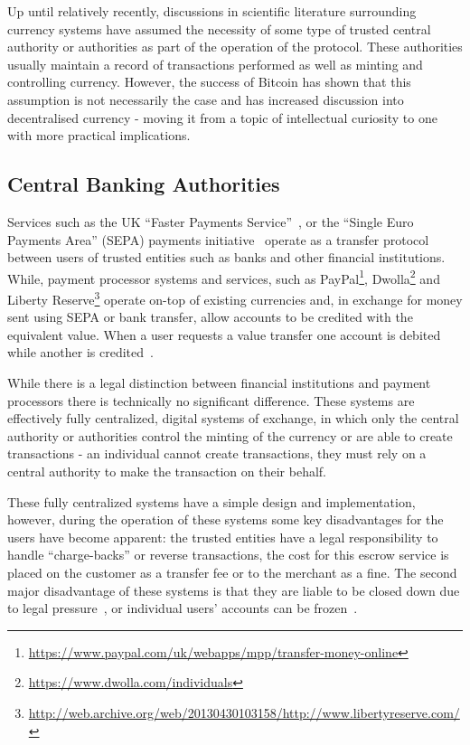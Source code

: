 Up until relatively recently, discussions in scientific literature surrounding currency systems have assumed the necessity of some type of trusted central authority or authorities as part of the operation of the protocol.  These authorities usually maintain a record of transactions performed as well as minting and controlling currency.  However, the success of Bitcoin has shown that this assumption is not necessarily the case and has increased discussion into decentralised currency - moving it from a topic of intellectual curiosity to one with more practical implications.

\subsection{Central Banking Authorities}
Services such as the UK ``Faster Payments Service''~\cite{guardian-fps}, or the ``Single Euro Payments Area'' (SEPA) payments initiative~\cite{SEPA} operate as a transfer protocol between users of trusted entities such as banks and other financial institutions.  While, payment processor systems and services, such as PayPal\footnote{\url{https://www.paypal.com/uk/webapps/mpp/transfer-money-online}}, Dwolla\footnote{\url{https://www.dwolla.com/individuals}} and Liberty Reserve\footnote{\url{http://web.archive.org/web/20130430103158/http://www.libertyreserve.com/}} operate on-top of existing currencies and, in exchange for money sent using SEPA or bank transfer, allow accounts to be credited with the equivalent value.  When a user requests a value transfer one account is debited while another is credited~\cite{paypal}.

While there is a legal distinction between financial institutions and payment processors there is technically no  significant difference.  These systems are effectively fully centralized, digital systems of exchange, in which only the central authority or authorities control the minting of the currency or are able to create transactions - an individual cannot create transactions, they must rely on a central authority to make the transaction on their behalf.

These fully centralized systems have a simple design and implementation, however, during the operation of these systems some key disadvantages for the users have become apparent: the trusted entities have a legal responsibility to handle ``charge-backs'' or reverse transactions, the cost for this escrow service is placed on the customer as a transfer fee or to the merchant as a fine. The second major disadvantage of these systems is that they are liable to be closed down due to legal pressure~\cite{lr-shutdown}, or individual users' accounts can be frozen~\cite{mtgox-dwolla,vlad:mtgox-dwolla}.


